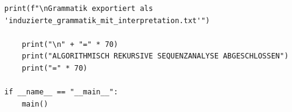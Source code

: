 \documentclass[
  12pt,
  a4paper,
  oneside,
  titlepage
]{article}
\begin{document}
\begin{lstlisting}[caption=Algorithmisch Rekursive Sequenzanalyse 3.0 - Hierarchische Grammatikinduktion]
    print(f"\nGrammatik exportiert als 'induzierte_grammatik_mit_interpretation.txt'")
    
    print("\n" + "=" * 70)
    print("ALGORITHMISCH REKURSIVE SEQUENZANALYSE ABGESCHLOSSEN")
    print("=" * 70)

if __name__ == "__main__":
    main()
\end{lstlisting}
\end{document}

